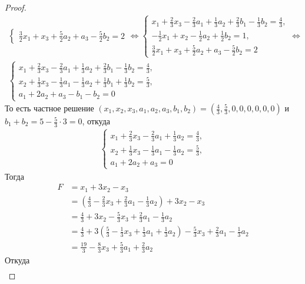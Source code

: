 \begin{proof}
\begin{gather*}
\begin{cases}
        \frac{3}{2}x_1 + x_3 + \frac{5}{2}a_2 + a_3 - \frac{5}{2}b_2 = 2
    \end{cases}
    \Leftrightarrow
    \begin{cases}
        x_1 + \frac{2}{3}x_3 - \frac{2}{3}a_1 + \frac{1}{3}a_2 + \frac{2}{3}b_1 - \frac{1}{3}b_2 = \frac{4}{3},\\
        -\frac{1}{2}x_1 + x_2 - \frac{1}{2}a_2 + \frac{1}{2}b_2 = 1,\\
        \frac{3}{2}x_1 + x_3 + \frac{5}{2}a_2 + a_3 - \frac{5}{2}b_2 = 2
    \end{cases}
    \Leftrightarrow\\
    \begin{cases}
        x_1 + \frac{2}{3}x_3 - \frac{2}{3}a_1 + \frac{1}{3}a_2 + \frac{2}{3}b_1 - \frac{1}{3}b_2 = \frac{4}{3},\\
        x_2 + \frac{1}{3}x_3 - \frac{1}{3}a_1 - \frac{1}{3}a_2 + \frac{1}{3}b_1 + \frac{1}{3}b_2 = \frac{5}{3},\\
        a_1 + 2a_2 + a_3 - b_1 - b_2= 0
    \end{cases}
    \end{gather*}
    То есть частное решение $(x_1, x_2, x_3, a_1, a_2, a_3, b_1, b_2) = (\frac{4}{3}, \frac{5}{3}, 0, 0, 0, 0, 0, 0)$ и $b_1 + b_2 = 5 - \frac{5}{3} \cdot 3 = 0$, откуда
    \begin{gather*}
    \begin{cases}
        x_1 + \frac{2}{3}x_3 - \frac{2}{3}a_1 + \frac{1}{3}a_2 = \frac{4}{3},\\
        x_2 + \frac{1}{3}x_3 - \frac{1}{3}a_1 - \frac{1}{3}a_2 = \frac{5}{3},\\
        a_1 + 2a_2 + a_3 = 0
    \end{cases}
    \end{gather*}
    Тогда
    \begin{align*}
        F &= x_1 + 3x_2 - x_3\\
        &= \left(\frac{4}{3} - \frac{2}{3}x_3 + \frac{2}{3}a_1 - \frac{1}{3}a_2\right) + 3x_2 - x_3\\
        &= \frac{4}{3} + 3x_2 - \frac{5}{3}x_3 + \frac{2}{3}a_1 - \frac{1}{3}a_2\\
        &= \frac{4}{3} + 3(\frac{5}{3} - \frac{1}{3}x_3 + \frac{1}{3}a_1 + \frac{1}{3}a_2) - \frac{5}{3}x_3 + \frac{2}{3}a_1 - \frac{1}{3}a_2\\
        &= \frac{19}{3} - \frac{8}{3}x_3 + \frac{5}{3}a_1 + \frac{2}{3}a_2
    \end{align*}
    Откуда
    \begin{gather*}

\end{gather*}
\end{proof}
